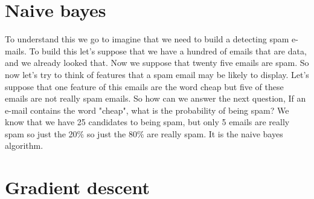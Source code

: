 \section{Naive bayes}
To understand this we go to imagine that we need to build a detecting spam e-mails. To build this let's suppose that we have a hundred of emails that are data, and we already looked that. Now we suppose that twenty five emails are spam. So now let's try to think of features that a spam email may be likely to display. Let's suppose that one feature of this emails are the word \textsf{cheap} but five of these emails are not really spam emails. So how can we answer the next question, If an e-mail contains the word "cheap", what is the probability of being spam? We know that we have 25 candidates to being spam, but only 5 emails are really spam so just the 20$\%$ so just the 80$\%$ are really spam. It is the naive bayes algorithm.

\section{Gradient descent}
